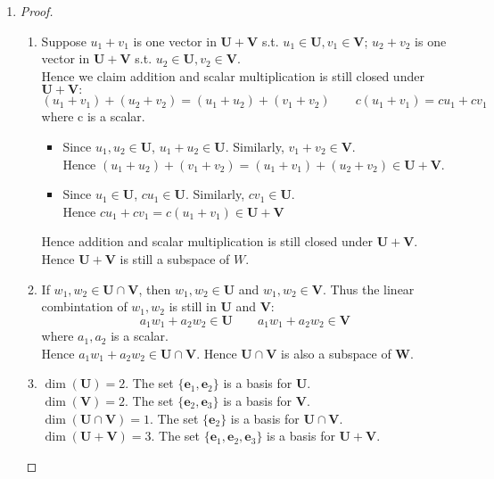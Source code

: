 \begin{enumerate}
\begin{proof}
\begin{enumerate}
\begin{itemize}
\[\begin{aligned}
\end{aligned}
\]
Hence $v_1.v_2,\dots,v_{n-1}$ still spans $\bm V$.
\item
If $v-_1,v_2,\dots,v_n$ still dep, we continue eliminating vectors until we get ind. vectors, say, $v_1,v_2,\dots,v_k$. Hence $\dim(\bm V) = k<n$. which contradicts $\dim(\bm V)=n$.
\end{itemize}
\end{enumerate}
\end{proof}
\item
\begin{proof}
\begin{enumerate}
\item
Suppose $u_1+v_1$ is one vector in $\bm{U+V}$ s.t. $u_1\in\bm U,v_1\in\bm V$; $u_2+v_2$ is one vector in $\bm{U+V}$ s.t. $u_2\in\bm U,v_2\in\bm V$.\\ Hence we claim addition and scalar multiplication is still closed under $\bm{U+V}:$
\[
(u_1+v_1)+(u_2+v_2)=(u_1+u_2)+(v_1+v_2)\qquad c(u_1+v_1)=cu_1+cv_1
\]
where c is a scalar.
\begin{itemize}
\item
Since $u_1,u_2\in\bm U$, $u_1+u_2\in\bm U$. Similarly, $v_1+v_2\in\bm V$. 
\\Hence $(u_1+u_2)+(v_1+v_2)=(u_1+v_1)+(u_2+v_2)\in\bm{U+V}$.
\item
Since $u_1\in\bm U$, $cu_1\in\bm U$. Similarly, $cv_1\in\bm U$.\\
Hence $cu_1+cv_1=c(u_1+v_1)\in\bm{U+V}$
\end{itemize}
Hence addition and scalar multiplication is still closed under $\bm{U+V}$. Hence $\bm{U+V}$ is still a subspace of $W.$
\item
If $w_1,w_2\in\bm{U\cap V}$, then $w_1,w_2\in\bm U$ and $w_1,w_2\in\bm V$. Thus the linear combintation of $w_1,w_2$ is still in $\bm U$ and $\bm V$:
\[
a_1w_1+a_2w_2\in\bm U\qquad a_1w_1+a_2w_2\in\bm V
\]
where $a_1,a_2$ is a scalar.\\
Hence $a_1w_1+a_2w_2\in\bm{U\cap V}$. Hence $\bm{U\cap V}$ is also a subspace of $\bm W$.
\item
$\dim(\bm U)=2$. The set $\{\bm e_1,\bm e_2\}$ is a basis for $\bm U$.\\
$\dim(\bm V)=2$. The set $\{\bm e_2,\bm e_3\}$ is a basis for $\bm V$.\\
$\dim (\bm{U\cap V})=1$. The set $\{\bm e_2\}$ is a basis for $\bm{U\cap V}$.\\
$\dim(\bm U+\bm V)=3$. The set $\{\bm e_1,\bm e_2,\bm e_3\}$ is a basis for $\bm U+\bm V$.

\end{enumerate}
\end{proof}
\end{enumerate}
